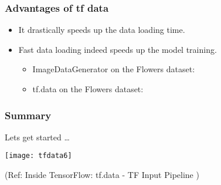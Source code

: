 \begin{frame}[fragile]\frametitle{Advantages of tf data}
\begin{itemize}
\item It drastically speeds up the data loading time.
\item Fast data loading indeed speeds up the model training. 
\begin{itemize}
\item ImageDataGenerator on the Flowers dataset:
\item tf.data on the Flowers dataset:
\end{itemize}
\end{itemize}
\end{frame}

\begin{frame}[fragile]\frametitle{Summary}
Lets get started \ldots

\begin{center}
\texttt{[image: tfdata6]}

{\tiny (Ref: Inside TensorFlow: tf.data - TF Input Pipeline )}

\end{center}
\end{frame}